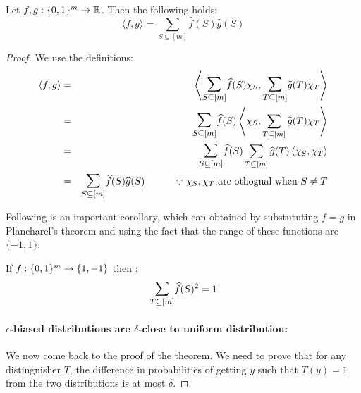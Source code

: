 \begin{theorem}
Let $f,g : \{0,1\}^m \to \mathbb{R}$. Then the following holds:
$$\langle f,g \rangle = \sum_{S \subseteq [m]} \widehat{f}(S) \hat{g}(S) $$
\end{theorem}
\begin{proof}
We use the definitions:
\begin{eqnarray*}
\langle f,g \rangle & = & \left\langle \bigsum_{S \subseteq [m]} \widehat{f}(S) \chi_S, \bigsum_{T \subseteq [m]} \widehat{g}(T)\chi_T \right\rangle \\
& = & \bigsum_{S \subseteq [m]}  \widehat{f}(S) \left\langle  \chi_S, \sum_{T \subseteq [m]} \widehat{g}(T)\chi_T \right\rangle \\
& = & \bigsum_{S \subseteq [m]}  \widehat{f}(S)   \sum_{T \subseteq [m]} \widehat{g}(T)\left\langle \chi_S, \chi_T \right\rangle \\
& = & \bigsum_{S \subseteq [m]}  \widehat{f}(S)  \widehat{g}(S) \textrm{  \hspace{1cm}$\because$ $\chi_S, \chi_T$ are othognal when $S \ne T$}
\end{eqnarray*}

Following is an important corollary, which can obtained by substututing $f = g$ in Plancharel's theorem and using the fact that the range of these functions are $\{-1,1\}$.
\begin{corollary}
If $f : \{0,1\}^m \to \{1,-1\}$ then :
$$ \bigsum_{T \subseteq [m]} \widehat{f}(S)^2 = 1$$
\end{corollary}

\paragraph{\bf $\epsilon$-biased distributions are $\delta$-close to uniform distribution:} We now come back to the proof of the theorem. We need to prove that for any distinguisher $T$, the difference in probabilities of getting $y$ such that $T(y)=1$ from the two distributions is at most $\delta$.


\end{proof}
